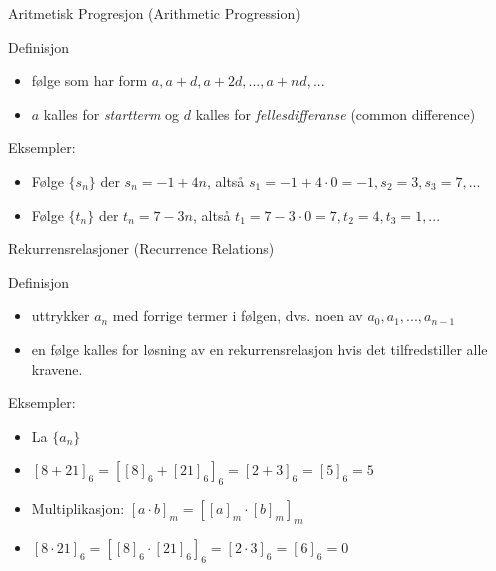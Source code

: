 \begin{frame}{Aritmetisk Progresjon (Arithmetic Progression)}
    \pause
    \begin{block}{Definisjon}
        \begin{itemize}
            \item følge som har form $a, a + d, a + 2d, ..., a + nd, ...$
            \item $a$ kalles for \textit{startterm} og $d$ kalles for \textit{fellesdifferanse} (common difference)
        \end{itemize}
    \end{block}
    \pause
    Eksempler:
    \begin{itemize}
        \item Følge $\{s_n\}$ der $s_n = -1 + 4n$, altså $s_1 = -1 + 4 \cdot 0 = -1, s_2 = 3, s_3 = 7, ...$
        \item Følge $\{t_n\}$ der $t_n = 7 - 3n$, altså $t_1 = 7 - 3 \cdot 0 = 7, t_2 = 4, t_3 = 1, ...$
    \end{itemize}
\end{frame}

\begin{frame}{Rekurrensrelasjoner (Recurrence Relations)}
    \begin{block}{Definisjon}
        \begin{itemize}
            \item uttrykker $a_n$ med forrige termer i følgen, dvs. noen av $a_0, a_1, ..., a_{n-1}$
            \item en følge kalles for løsning av en rekurrensrelasjon hvis det tilfredstiller alle kravene.
        \end{itemize}
    \end{block}
    \pause
    Eksempler:
    \begin{itemize}
        \item La $\{a_n\}$
        \item $[8+21]_6 = [[8]_6 + [21]_6]_6 = [2 + 3]_6 = [5]_6 = 5$
\item Multiplikasjon: $[a\cdot b]_m = [[a]_m \cdot [b]_m]_m$
\item $[8 \cdot 21]_6 = [[8]_6 \cdot [21]_6]_6 = [2 \cdot 3]_6 = [6]_6 = 0$
\end{itemize}
\end{frame}

